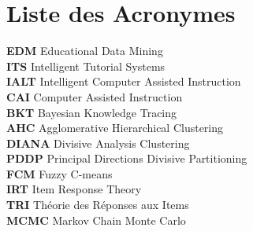 \chapter*{Liste des Acronymes }
\textbf{EDM}\hspace{0.5cm}  Educational Data Mining\\
\textbf{ITS}\hspace{0.5cm}  Intelligent Tutorial Systems\\
\textbf{IALT}\hspace{0.5cm}  Intelligent Computer Assisted Instruction\\
\textbf{CAI}\hspace{0.5cm}  Computer Assisted Instruction\\
\textbf{BKT}\hspace{0.5cm}  Bayesian Knowledge Tracing\\
\textbf{AHC}\hspace{0.5cm}  Agglomerative Hierarchical Clustering\\
\textbf{DIANA}\hspace{0.5cm}  Divisive Analysis Clustering\\
\textbf{PDDP}\hspace{0.5cm}  Principal Directions Divisive Partitioning\\
\textbf{FCM}\hspace{0.5cm}  Fuzzy C-means\\
\textbf{IRT}\hspace{0.5cm}  Item Response Theory\\
\textbf{TRI}\hspace{0.5cm}  Théorie des Réponses aux Items\\
\textbf{MCMC}\hspace{0.5cm}  Markov Chain Monte Carlo\\





